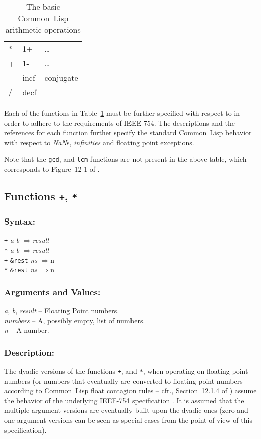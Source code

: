 \documentclass[10pt,fleqn]{article}
\newcommand{\CL}{\textsf{Common~Lisp}}
\newcommand{\code}[1]{\texttt{#1}}
\newcommand{\varname}[1]{\textit{#1}}
\newcommand{\RArrow}{$\Rightarrow$}
\newcommand{\IEEEFPStd}{IEEE-754}
\newcommand{\DDictionaryItem}[1]{\vspace*{6pt}\noindent\hrulefill\vspace*{-9pt}\subsection*{#1}}
\newcommand{\DSyntax}{\subsubsection*{Syntax:}}
\newcommand{\DArgsNValues}{\subsubsection*{Arguments and Values:}}
\newcommand{\DDescription}{\subsubsection*{Description:}}
\begin{document}
\begin{table}[h!]
  \centering
  \begin{tt}
    \begin{tabular}{lll}
      * & 1+ & \ldots \\
      + & 1- & \ldots \\
      - & incf & conjugate\\
      / & decf & \\
    \end{tabular}
  \end{tt}
  \caption{The basic \CL{} arithmetic operations}
  \label{table:cl-arit-ops}
\end{table}

\noindent
Each of the functions in Table~\ref{table:cl-arit-ops} must be further
specified with respect to \cite{1996:ANSIHyperSpec} in order to adhere to
the requirements of \IEEEFPStd{}.  The descriptions and the references for
each function further specify the standard \CL{} behavior with respect
to \emph{NaN}s, \emph{infinities} and floating point exceptions.

\vspace*{3mm}

\noindent
Note that the \code{gcd}, and \code{lcm} functions are not
present in the above table, which corresponds to Figure~12-1 of
\cite{1996:ANSIHyperSpec}.


\DDictionaryItem{Functions \code{+}, \code{*}}

\DSyntax{}

\code{+} \varname{a} \varname{b} \RArrow \varname{result}\\
\code{*} \varname{a} \varname{b} \RArrow \varname{result}\\
\code{+} \code{\&rest} \varname{ns} \RArrow \varname \code{n}\\
\code{*} \code{\&rest} \varname{ns} \RArrow \varname \code{n}\\

\DArgsNValues{}

\varname{a}, \varname{b}, \varname{result} -- Floating Point numbers.\\
\varname{numbers} -- A, possibly empty, list of numbers.\\
\varname{n} -- A number.



\DDescription{}

The dyadic versions of the functions \code{+}, and \code{*}, when operating on
floating point numbers (or numbers that eventually are converted to
floating point numbers according to \CL{} float contagion rules -- cfr.,
Section~12.1.4 of \cite{1996:ANSIHyperSpec}) assume the behavior of the
underlying \IEEEFPStd{} specification \cite{2008:IEEE-754}.  It is assumed that
the multiple argument versions are eventually built upon the dyadic
ones (zero and one argument versions can be seen as special cases from
the point of view of this specification).
\end{document}
